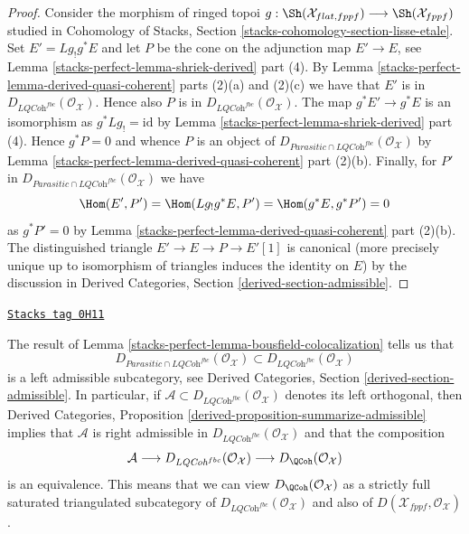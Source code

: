 \begin{proof}
Consider the morphism of ringed topoi
$g : \Sh(\mathcal{X}_{flat, fppf}) \longrightarrow \Sh(\mathcal{X}_{fppf})$
studied in Cohomology of Stacks, Section
\ref{stacks-cohomology-section-lisse-etale}.
Set $E' = Lg_!g^*E$ and let $P$ be the cone on the adjunction
map $E' \to E$, see Lemma \ref{stacks-perfect-lemma-shriek-derived} part (4).
By Lemma \ref{stacks-perfect-lemma-derived-quasi-coherent} parts (2)(a) and (2)(c)
we have that $E'$ is in $D_{\textit{LQCoh}^{fbc}}(\mathcal{O}_\mathcal{X})$.
Hence also $P$ is in $D_{\textit{LQCoh}^{fbc}}(\mathcal{O}_\mathcal{X})$.
The map $g^*E' \to g^*E$ is an isomorphism as $g^*Lg_! = \text{id}$ by
Lemma \ref{stacks-perfect-lemma-shriek-derived} part (4).
Hence $g^*P = 0$ and whence $P$ is an object of
$D_{\textit{Parasitic} \cap \textit{LQCoh}^{fbc}}(\mathcal{O}_\mathcal{X})$ by
Lemma \ref{stacks-perfect-lemma-derived-quasi-coherent} part (2)(b).
Finally, for $P'$ in
$D_{\textit{Parasitic} \cap \textit{LQCoh}^{fbc}}(\mathcal{O}_\mathcal{X})$
we have
$$
\Hom(E', P') = \Hom(Lg_!g^*E, P') = \Hom(g^*E, g^*P') = 0
$$
as $g^*P' = 0$ by Lemma \ref{stacks-perfect-lemma-derived-quasi-coherent} part (2)(b).
The distinguished triangle $E' \to E \to P \to E'[1]$ is canonical
(more precisely unique up to isomorphism of triangles induces the
identity on $E$) by the discussion in Derived Categories, Section
\ref{derived-section-admissible}.
\end{proof}

\begin{remark}
\label{stacks-perfect-remark-QCoh-admissible}
\href{https://stacks.math.columbia.edu/tag/0H11}{\texttt{Stacks tag 0H11}}

The result of Lemma \ref{stacks-perfect-lemma-bousfield-colocalization} tells us that
$$
D_{\textit{Parasitic} \cap \textit{LQCoh}^{fbc}}(\mathcal{O}_\mathcal{X})
\subset
D_{\textit{LQCoh}^{fbc}}(\mathcal{O}_\mathcal{X})
$$
is a left admissible subcategory, see
Derived Categories, Section \ref{derived-section-admissible}.
In particular, if
$\mathcal{A} \subset D_{\textit{LQCoh}^{fbc}}(\mathcal{O}_\mathcal{X})$
denotes its left orthogonal, then Derived Categories, Proposition
\ref{derived-proposition-summarize-admissible}
implies that $\mathcal{A}$ is right admissible in
$D_{\textit{LQCoh}^{fbc}}(\mathcal{O}_\mathcal{X})$ and that
the composition
$$
\mathcal{A} \longrightarrow
D_{\textit{LQCoh}^{fbc}}(\mathcal{O}_\mathcal{X}) \longrightarrow
D_\QCoh(\mathcal{O}_\mathcal{X})
$$
is an equivalence. This means that we can view
$D_\QCoh(\mathcal{O}_\mathcal{X})$ as a strictly full saturated
triangulated subcategory of $D_{\textit{LQCoh}^{fbc}}(\mathcal{O}_\mathcal{X})$
and also of $D(\mathcal{X}_{fppf}, \mathcal{O}_\mathcal{X})$.
\end{remark}

